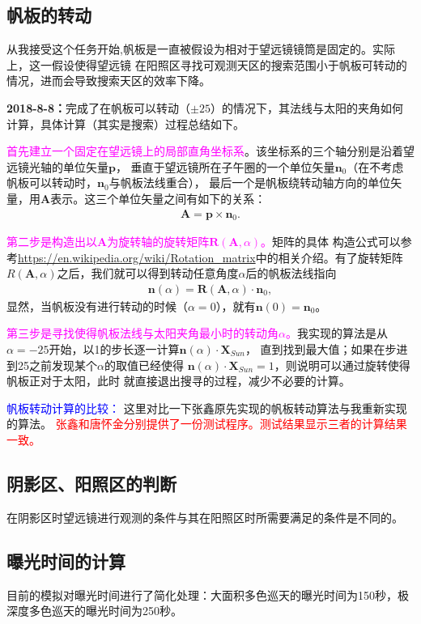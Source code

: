 \documentclass[a4paper,11pt]{ctexart}
\newcommand{\RT}[1]{\textcolor{red}{#1}}
\newcommand{\BT}[1]{\textcolor{blue}{#1}}
\newcommand{\MT}[1]{\textcolor{magenta}{#1}}
\begin{document}
\subsection{帆板的转动}
\label{sub:panel}
从我接受这个任务开始,帆板是一直被假设为相对于望远镜镜筒是固定的。实际上，这一假设使得望远镜
在阳照区寻找可观测天区的搜索范围小于帆板可转动的情况，进而会导致搜索天区的效率下降。

\textbf{2018-8-8：}完成了在帆板可以转动（$\pm 25$\textdegree）的情况下，其法线与太阳的夹角如何
计算，具体计算（其实是搜索）过程总结如下。

\MT{\heiti 首先建立一个固定在望远镜上的局部直角坐标系}。该坐标系的三个轴分别是沿着望远镜光轴的单位矢量$\bm{p}$，
垂直于望远镜所在子午圈的一个单位矢量$\bm{n}_{0}$（在不考虑帆板可以转动时，$\bm{n}_{0}$与帆板法线重合），
最后一个是帆板绕转动轴方向的单位矢量，用$\bm{A}$表示。这三个单位矢量之间有如下的关系：
\begin{eqnarray}
\bm{A}=\bm{p}\times\bm{n}_{0}.
\end{eqnarray}

\MT{\heiti 第二步是构造出以$\bm{A}$为旋转轴的旋转矩阵$\bm{R}(\bm{A},\alpha)$。}矩阵的具体
构造公式可以参考\url{https://en.wikipedia.org/wiki/Rotation_matrix}中的相关介绍。有了旋转矩阵
$R(\bm{A},\alpha)$之后，我们就可以得到转动任意角度$\alpha$后的帆板法线指向
\begin{eqnarray}
\bm{n}(\alpha) = \bm{R}(\bm{A},\alpha)\cdot\bm{n}_{0},
\end{eqnarray}
显然，当帆板没有进行转动的时候（$\alpha=0$），就有$\bm{n}(0)=\bm{n}_{0}$。

\MT{\heiti 第三步是寻找使得帆板法线与太阳夹角最小时的转动角$\alpha$。}我实现的算法是从
$\alpha=-25$\textdegree 开始，以1\textdegree 的步长逐一计算$\bm{n}(\alpha)\cdot\bm{X}_{Sun}$，
直到找到最大值；如果在步进到25\textdegree 之前发现某个$\alpha$的取值已经使得
$\bm{n}(\alpha)\cdot\bm{X}_{Sun}=1$，则说明可以通过旋转使得帆板正对于太阳，此时
就直接退出搜寻的过程，减少不必要的计算。

\BT{\heiti 帆板转动计算的比较：}
这里对比一下张鑫原先实现的帆板转动算法与我重新实现的算法。
\RT{张鑫和唐怀金分别提供了一份测试程序。测试结果显示三者的计算结果一致。}


\subsection{阴影区、阳照区的判断}
在阴影区时望远镜进行观测的条件与其在阳照区时所需要满足的条件是不同的。

\subsection{曝光时间的计算}
目前的模拟对曝光时间进行了简化处理：大面积多色巡天的曝光时间为150秒，极深度多色巡天的曝光时间为250秒。
\end{document}
